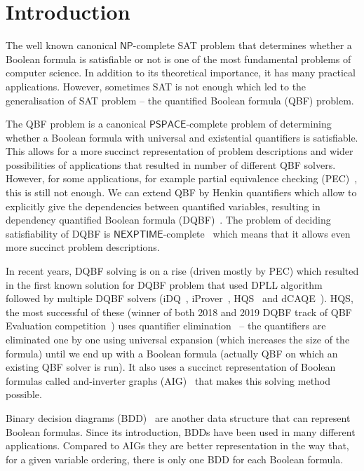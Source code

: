 \documentclass[
  digital, %
  color,
  twoside, %
  table,   %
  nolof,     %
  nolot,     %
]{fithesis3}
\theoremstyle{definition}
\theoremstyle{remark}
\newcommand{\ComplexityFont}[1]{\mathsf{#1}}
\newcommand{\PSPACE}{\ComplexityFont{PSPACE}}
\newcommand{\NP}{\ComplexityFont{NP}}
\newcommand{\NEXPTIME}{\ComplexityFont{NEXPTIME}}
\begin{document}
\chapter{Introduction}
The well known canonical $\NP$-complete SAT problem that determines whether a Boolean formula is satisfiable or not is one of the most fundamental problems of computer science. In addition to its theoretical importance, it has many practical applications. However, sometimes SAT is not enough which led to the generalisation of SAT problem -- the quantified Boolean formula (QBF) problem. %

The QBF problem is a canonical $\PSPACE$-complete problem of determining whether a Boolean formula with universal and existential quantifiers is satisfiable. This allows for a more succinct representation of problem descriptions and wider possibilities of applications that resulted in number of different QBF solvers. However, for some applications, for example partial equivalence checking (PEC)~\cite{HQSsimpleAlg}, this is still not enough. We can extend QBF by Henkin quantifiers which allow to explicitly give the dependencies between quantified variables, resulting in dependency quantified Boolean formula (DQBF)~\cite{NegationOfDQBFs}. The problem of deciding satisfiability of DQBF is $\NEXPTIME$-complete~\cite{DQBFisNEXPTIME} which means that it allows even more succinct problem descriptions.

In recent years, DQBF solving is on a rise (driven mostly by PEC) which resulted in the first known solution for DQBF problem that used DPLL algorithm~\cite{DPLLalgorithm} followed by multiple DQBF solvers (iDQ~\cite{iDQandDQDIMACS}, iProver~\cite{iProver}, HQS~\cite{HQSquantifierElimination,HQSdependencyElimination,HQSquantifierLocalisation} and dCAQE~\cite{dCAQE}). HQS, the most successful of these (winner of both 2018 and 2019 DQBF track of QBF Evaluation competition~\cite{QBFeval18,QBFeval19}) uses quantifier elimination~\cite{HQSquantifierElimination} -- the quantifiers are eliminated one by one using universal expansion (which increases the size of the formula) until we end up with a Boolean formula (actually QBF on which an existing QBF solver is run). It also uses a succinct representation of Boolean formulas called and-inverter graphs (AIG)~\cite{FRAIGs} that makes this solving method possible.

Binary decision diagrams (BDD)~\cite{BDD} are another data structure that can represent Boolean formulas. Since its introduction, BDDs have been used in many different applications. Compared to AIGs they are better representation in the way that, for a given variable ordering, there is only one BDD for each Boolean formula.
\end{document}
